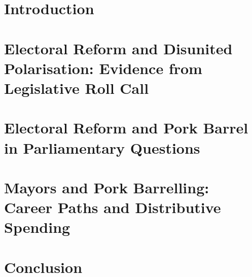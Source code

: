\documentclass[12pt,leqno]{report}
\begin{document}



\chapter{Introduction}
\clearpage

\chapter{Electoral Reform and Disunited Polarisation: Evidence from Legislative Roll Call \label{chap:ch2}    } 
\clearpage
 
\chapter{Electoral Reform and Pork Barrel in Parliamentary Questions  \label{chap:ch3}  }
\clearpage

\chapter{Mayors and Pork Barrelling: Career Paths and Distributive Spending \label{chap:ch4}}
\clearpage

\chapter{Conclusion}
\clearpage

\appendix
\printbibliography
\end{document}
